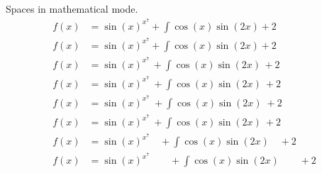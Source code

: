 \documentclass{article}
\begin{document}
               Spaces in mathematical mode.
             \begin{align*}
                   f(x) &= \sin(x)^{x^7}\! +\int\cos(x)\sin(2x)\! +2 \\
                   f(x) &= \sin(x)^{x^7}+\int\cos(x)\sin(2x)+2 \\
                   f(x) &= \sin(x)^{x^7}\, +\int\cos(x)\sin(2x)\, +2 \\
                   f(x) &= \sin(x)^{x^7}\: +\int\cos(x)\sin(2x)\: +2 \\
                   f(x) &= \sin(x)^{x^7}\; +\int\cos(x)\sin(2x)\; +2 \\
                   f(x) &= \sin(x)^{x^7}\ +\int\cos(x)\sin(2x)\ +2 \\
                   f(x) &= \sin(x)^{x^7}\quad +\int\cos(x)\sin(2x)\quad +2 \\
                   f(x) &= \sin(x)^{x^7}\qquad +\int\cos(x)\sin(2x)\qquad +2
             \end{align*}
         
\end{document}
